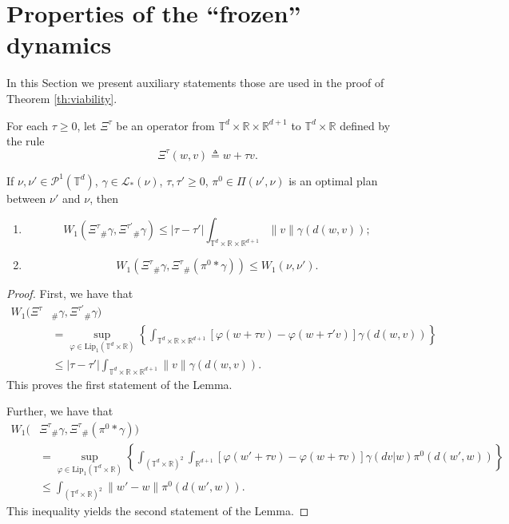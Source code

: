 \documentclass[a4paper,12pt]{article}
\newcommand{\rdp}{\mathbb{R}^{d+1}}
\newcommand{\tdr}{\mathbb{T}^{d}\times\mathbb{R}}
\newcommand{\ptd}{\mathcal{P}^1(\mathbb{T}^d)}
\begin{document}
\section{Properties of the ``frozen'' dynamics}\label{sect:auxiliary}
In this Section we present  auxiliary statements those are used in the proof of Theorem \ref{th:viability}.

For each $\tau\geq 0$, let $\Xi^\tau$ be an operator from $\tdr\times\rdp$ to $\tdr$ defined by the rule
\begin{equation}\label{intro:Xi}
\Xi^{\tau}(w,v)\triangleq w+\tau v. 
\end{equation}

\begin{lemma}\label{lm:Theta_pi}
	If $\nu,\nu'\in\ptd$,  $\gamma\in \mathcal{L}_*(\nu)$, $\tau,\tau'\geq 0$, $\pi^0\in\Pi(\nu',\nu)$ is an optimal plan between $\nu'$ and $\nu$,
	then
	\begin{enumerate}
		\item $$W_1(\Xi^{\tau}{}_\#\gamma,\Xi^{\tau'}{}_\#\gamma)\leq |\tau-\tau'|\int_{\tdr\times\rdp} \|v\|\gamma(d(w,v));$$
		\item
		$$W_1(\Xi^\tau{}_\#\gamma,\Xi^\tau{}_\#(\pi^0*\gamma))\leq W_1(\nu,\nu'). $$
	\end{enumerate}
\end{lemma}
\begin{proof}
	First, we have that
	\begin{equation*}
	\begin{split}
	W_1(\Xi^{\tau}&{}_\#\gamma,\Xi^{\tau'}{}_\#\gamma)\\&= \sup_{\varphi\in\mathrm{Lip}_1(\tdr)}\left\{\int_{\tdr\times\rdp}[\varphi(w+\tau v)-\varphi(w+\tau' v)]\gamma(d(w,v))\right\} \\
	&\leq |\tau-\tau'|\int_{\tdr\times\rdp} \|v\|\gamma(d(w,v)).
	\end{split}
	\end{equation*} This proves the first statement of the Lemma.
	
	Further, we have that
	\begin{equation*}
	\begin{split}
	W_1(&\Xi^\tau{}_\#\gamma,\Xi^\tau{}_\#(\pi^0*\gamma))\\
	&=\sup_{\varphi\in\mathrm{Lip}_1(\tdr)} \left\{\int_{(\tdr)^2}\int_{\rdp}
	[\varphi(w'+\tau v)-\varphi(w+\tau v)]\gamma(dv|w)\pi^0(d(w',w))\right\} \\
	&\leq \int_{(\tdr)^2}\|w'-w\|\pi^0(d(w',w)).
	\end{split}
	\end{equation*} This inequality yields the second statement of the Lemma.
\end{proof}
\end{document}
